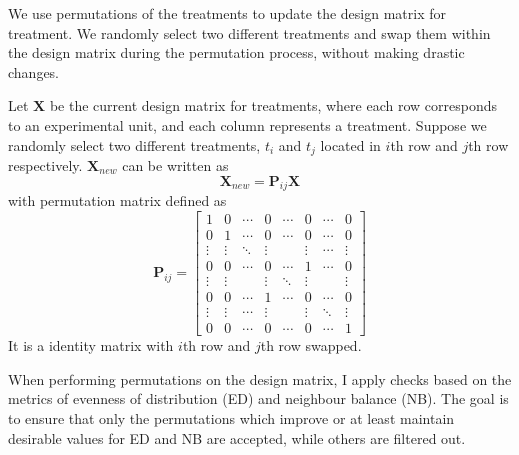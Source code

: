 \documentclass[
  a4paper,
  oneside,
  openany,
  12pt,
  onecolumn]{book}
\theoremstyle{plain}
\theoremstyle{definition}
\theoremstyle{remark}
\begin{document}
We use permutations of the treatments to update the design matrix for
treatment. We randomly select two different treatments and swap them
within the design matrix during the permutation process, without making
drastic changes.

Let \(\boldsymbol{X}\) be the current design matrix for treatments,
where each row corresponds to an experimental unit, and each column
represents a treatment. Suppose we randomly select two different
treatments, \(t_i\) and \(t_j\) located in \(i\)th row and \(j\)th row
respectively. \(\boldsymbol{X}_{new}\) can be written as \[
\boldsymbol{X}_{new} = \boldsymbol{P}_{ij}\boldsymbol{X}
\] with permutation matrix defined as \[
 \boldsymbol{P}_{i j}=\left[
 \begin{array}{cccccccc}
 1 & 0 & \cdots & 0 & \cdots & 0 & \cdots & 0 \\ 
 0 & 1 & \cdots & 0 & \cdots &0 & \cdots & 0 \\ 
 \vdots & \vdots & \ddots & \vdots & & \vdots & \cdots & \vdots \\ 
 0 & 0 & \cdots & 0 & \cdots & 1 & \cdots & 0 \\
 \vdots & \vdots & & \vdots & \ddots & \vdots & & \vdots\\
 0 & 0 & \cdots & 1 & \cdots & 0 & \cdots & 0 \\ 
 \vdots & \vdots & \cdots & \vdots & & \vdots & \ddots & \vdots \\ 
 0 & 0 & \cdots & 0 & \cdots & 0 & \cdots & 1
 \end{array}\right] 
\] It is a identity matrix with \(i\)th row and \(j\)th row swapped.

When performing permutations on the design matrix, I apply checks based
on the metrics of evenness of distribution (ED) and neighbour balance
(NB). The goal is to ensure that only the permutations which improve or
at least maintain desirable values for ED and NB are accepted, while
others are filtered out.
\end{document}

